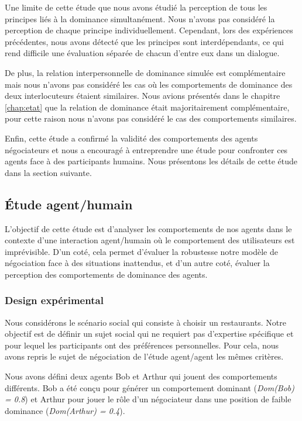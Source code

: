 {				Une limite de cette étude que nous avons étudié la perception de tous les principes liés à la dominance simultanément. Nous n'avons pas considéré la perception de chaque principe individuellement. Cependant, lors des expériences précédentes, nous avons détecté que les principes sont interdépendants, ce qui rend difficile une évaluation séparée de chacun d'entre eux dans un dialogue.
				
				De plus, la relation interpersonnelle de dominance simulée est complémentaire mais nous n'avons pas considéré les cas où les comportements de dominance des deux interlocuteurs étaient similaires. Nous avions présentés dans le chapitre \ref{chap:etat} que la relation de dominance était majoritairement complémentaire, pour cette raison nous n'avons pas considéré le cas des comportements similaires. 
				
				Enfin, cette étude a confirmé la validité des comportements des agents négociateurs et nous a encouragé à entreprendre une étude pour confronter ces agents face à des participants humains. Nous présentons les détails de cette étude dans la section suivante.
				
		\subsection{Étude agent/humain}
		
					L'objectif de cette étude est d'analyser les comportements de nos agents dans le contexte d'une interaction agent/humain où le comportement des utilisateurs est imprévisible. D'un coté, cela permet d'évaluer la robustesse notre modèle de négociation face à des situations inattendus, et d'un autre coté, évaluer la perception des comportements de dominance des agents. 
					
					
				\subsubsection{Design expérimental}
				
				Nous considérons le scénario social qui consiste à choisir un restaurants. Notre objectif est de définir un sujet social qui ne requiert pas d'expertise spécifique et pour lequel les participants ont des préférences personnelles. Pour cela, nous avons repris le sujet de négociation de l'étude agent/agent les mêmes critères.
					
				Nous avons défini deux agents Bob et Arthur qui jouent des comportements différents. Bob a été conçu pour générer un comportement dominant (\textit{Dom(Bob) = 0.8}) et Arthur pour jouer le rôle d'un négociateur dans une position de faible dominance (\textit{Dom(Arthur) = 0.4}).
			
}
